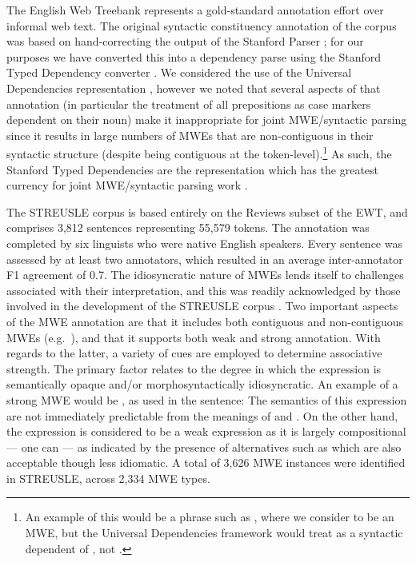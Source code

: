 \documentclass[output=paper
,modfonts
,nonflat]{langsci/langscibook}
\begin{document}
The English Web Treebank \citep{EWT} represents a gold-standard annotation effort over informal web text. The original syntactic constituency annotation of the corpus was based on hand-correcting the output of the Stanford Parser \citep{Manning+:2014}; for our purposes we have converted this into a dependency parse using the Stanford Typed Dependency converter \citep{StanfordDep}. We considered the use of the Universal Dependencies representation \citep{univdep}, however we noted that several aspects of that annotation (in particular the treatment of all prepositions as case markers dependent on their noun) make it inappropriate for joint MWE/syntactic parsing since it results in large numbers of MWEs that are non-contiguous in their syntactic structure (despite being contiguous at the token-level).\footnote{An example of this would be a phrase such as , where we consider  to be an MWE, but the Universal Dependencies framework would treat  as a syntactic dependent of , not .} As such, the Stanford Typed Dependencies are the representation which has the greatest currency for joint MWE/syntactic parsing work \citep{constant-nivre:acl:2016}. 

The STREUSLE corpus \citep{schneider2014} is based entirely on the Reviews subset of the EWT, and comprises 3,812 sentences representing 55,579 tokens. The annotation was completed by six linguists who were native English speakers. Every sentence was assessed by at least two annotators, which resulted in an average inter-annotator F1 agreement of 0.7. The idiosyncratic nature of MWEs lends itself to challenges associated with their interpretation, and this was readily acknowledged by those involved in the development of the STREUSLE corpus \citep{Hollenstein16}. Two important aspects of the MWE annotation are that it includes both contiguous and non-contiguous MWEs (e.g.\ ), and that it supports both weak and strong annotation. With regards to the latter, a variety of cues are employed to determine associative strength. The primary factor relates to the degree in which the expression is semantically opaque and/or morphosyntactically idiosyncratic. An example of a strong MWE would be , as used in the sentence:  The semantics of this expression are not immediately predictable from the meanings of  and . On the other hand, the expression  is considered to be a weak expression as it is largely compositional --- one can  --- as indicated by the presence of alternatives such as  which are also acceptable though less idiomatic. A total of 3,626 MWE instances were identified in STREUSLE, across 2,334 MWE types.
\end{document}
